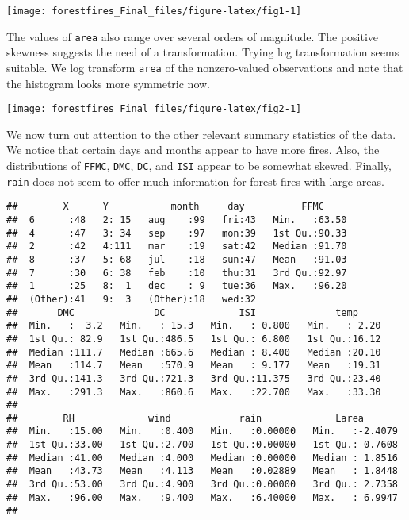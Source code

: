 \documentclass[]{article}
\begin{document}
\begin{center}\texttt{[image: forestfires\_Final\_files/figure-latex/fig1-1]} \end{center}

The values of \texttt{area} also range over several orders of magnitude.
The positive skewness suggests the need of a transformation. Trying log
transformation seems suitable. We log transform \texttt{area} of the
nonzero-valued observations and note that the histogram looks more
symmetric now.

\begin{center}\texttt{[image: forestfires\_Final\_files/figure-latex/fig2-1]} \end{center}

We now turn out attention to the other relevant summary statistics of
the data. We notice that certain days and months appear to have more
fires. Also, the distributions of \texttt{FFMC}, \texttt{DMC},
\texttt{DC}, and \texttt{ISI} appear to be somewhat skewed. Finally,
\texttt{rain} does not seem to offer much information for forest fires
with large areas.

\begin{verbatim}
##        X      Y           month     day          FFMC      
##  6      :48   2: 15   aug    :99   fri:43   Min.   :63.50  
##  4      :47   3: 34   sep    :97   mon:39   1st Qu.:90.33  
##  2      :42   4:111   mar    :19   sat:42   Median :91.70  
##  8      :37   5: 68   jul    :18   sun:47   Mean   :91.03  
##  7      :30   6: 38   feb    :10   thu:31   3rd Qu.:92.97  
##  1      :25   8:  1   dec    : 9   tue:36   Max.   :96.20  
##  (Other):41   9:  3   (Other):18   wed:32                  
##       DMC              DC             ISI              temp      
##  Min.   :  3.2   Min.   : 15.3   Min.   : 0.800   Min.   : 2.20  
##  1st Qu.: 82.9   1st Qu.:486.5   1st Qu.: 6.800   1st Qu.:16.12  
##  Median :111.7   Median :665.6   Median : 8.400   Median :20.10  
##  Mean   :114.7   Mean   :570.9   Mean   : 9.177   Mean   :19.31  
##  3rd Qu.:141.3   3rd Qu.:721.3   3rd Qu.:11.375   3rd Qu.:23.40  
##  Max.   :291.3   Max.   :860.6   Max.   :22.700   Max.   :33.30  
##                                                                  
##        RH             wind            rain             Larea        
##  Min.   :15.00   Min.   :0.400   Min.   :0.00000   Min.   :-2.4079  
##  1st Qu.:33.00   1st Qu.:2.700   1st Qu.:0.00000   1st Qu.: 0.7608  
##  Median :41.00   Median :4.000   Median :0.00000   Median : 1.8516  
##  Mean   :43.73   Mean   :4.113   Mean   :0.02889   Mean   : 1.8448  
##  3rd Qu.:53.00   3rd Qu.:4.900   3rd Qu.:0.00000   3rd Qu.: 2.7358  
##  Max.   :96.00   Max.   :9.400   Max.   :6.40000   Max.   : 6.9947  
## 
\end{verbatim}
\end{document}
